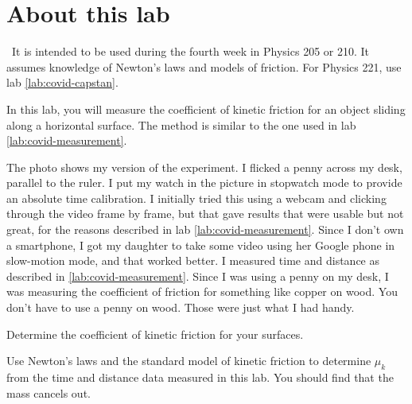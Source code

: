 \addtocounter{chapter}{-1}
\renewcommand\thechapter{c1.4a}
\label{lab:covid-mu-k}

\section*{About this lab}

\covid\ 
It is intended to be used during the fourth week in Physics 205 or 210.
It assumes knowledge of Newton's laws and models of friction. For Physics
221, use lab \ref{lab:covid-capstan}.

\observations

In this lab, you will measure the coefficient of kinetic friction for an object
sliding along a horizontal surface. The method is similar to the one used in lab \ref{lab:covid-measurement}.

The photo shows my version of the experiment. I flicked a penny across my desk, parallel
to the ruler. I put my watch in the picture in stopwatch mode to provide an absolute time
calibration. I initially tried this using a webcam and clicking through the video frame by
frame, but that gave results that were usable but not great, for the reasons described in lab \ref{lab:covid-measurement}.
Since I don't own a smartphone, I got my daughter to take some video using her Google phone
in slow-motion mode, and that worked better. I measured time and distance as described in
\ref{lab:covid-measurement}. Since I was using a penny on my desk, I was measuring the coefficient
of friction for something like copper on wood. You don't have to use a penny on wood. Those were
just what I had handy.



\analysis

Determine the coefficient of kinetic friction for your surfaces.

\prelab

\prelabquestion  
Use Newton's laws and the standard model of kinetic friction to determine $\mu_k$ from
the time and distance data measured in this lab. You should find that the mass cancels
out.




